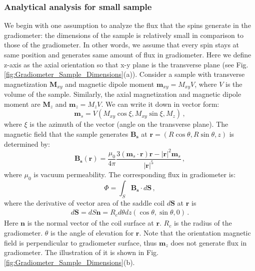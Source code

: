 \subsubsection{Analytical analysis for small sample}\label{sec:Signal_response:flux:small}

We begin with one assumption to analyze the flux that the spins generate in the gradiometer: the dimensions of the sample is relatively small in comparison to those of the gradiometer. In other words, we assume that every spin stays at same position and generates same amount of flux in gradiometer. Here we define z-axis as the axial orientation so that x-y plane is the transverse plane (see Fig.\,\ref{fig:Gradiometer_Sample_Dimensions}(a)). 
Consider a sample with transverse magnetization $\mathbf{M}_{xy}$ and magnetic dipole moment $\mathbf{m}_{xy} = M_{xy} V$, where $V$ is the volume of the sample. Similarly, the axial magnetization and magnetic dipole moment are $\mathbf{M}_{z}$ and $\mathbf{m}_{z} = M_{z} V$. 
We can write it down in vector form:
\begin{equation}\label{eq:smallsample:m_s}
    \mathbf{m}_s= V(M_{xy}\cos{\xi}, M_{xy}\sin{\xi}, M_{z})\,,
\end{equation}
where $\xi$ is the azimuth of the vector (angle on the transverse plane). 
The magnetic field that the sample generates $\mathbf{B_s}$ at $\mathbf{r}=(R\cos\theta,R\sin\theta,z)$ is determined by:
\begin{equation}\label{eq:smallsample:B_s}
    \mathbf{B_s}(\mathbf{r})=\frac{\mu_0}{4\pi} \frac{3(\mathbf{m}_s\cdot\mathbf{r})\mathbf{r} - |\mathbf{r}|^2 \mathbf{m}_s}{|\mathbf{r}|^5}\,,
\end{equation}
where $\mu_0$ is vacuum permeability. The corresponding flux in gradiometer is:
\begin{equation}\label{eq:smallsample:Phi}
    \Phi = \int_{S} \mathbf{B_s}\cdot d\mathbf{S}\,,
\end{equation}
where the derivative of vector area of the saddle coil $d\mathbf{S}$ at $\mathbf{r}$ is
\begin{align}
    d\mathbf{S}=dS\mathbf{n}=R_c d\theta dz (\cos\theta, \sin \theta, 0)\,.\label{eq:Coil_dS}
\end{align}
Here $\mathbf{n}$ is the normal vector of the coil surface at $\mathbf{r}$. $R_c$ is the radius of the gradiometer. $\theta$ is the angle of elevation for $\mathbf{r}$. 
Note that the orientation magnetic field is perpendicular to gradiometer surface, thus $\mathbf{m}_{z}$ does not generate flux in gradiometer.  
The illustration of it is shown in Fig.\,\ref{fig:Gradiometer_Sample_Dimensions}(b). 

